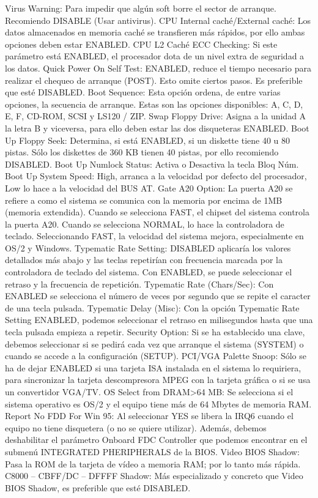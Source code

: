\documentclass[12pt,oneside,a4paper]{article}
\begin{document}
			Virus Warning: Para impedir que algún soft borre el sector de arranque. Recomiendo DISABLE
      (Usar antivirus).
CPU Internal caché/External caché: Los datos almacenados en memoria caché se transfieren
      más rápidos, por ello ambas opciones deben estar ENABLED.
CPU L2 Caché ECC Checking: Si este parámetro está ENABLED, el procesador dota de un
      nivel extra de seguridad a los datos.
Quick Power On Self Test: ENABLED, reduce el tiempo necesario para realizar el chequeo de
        arranque (POST). Esto omite ciertos pasos. Es preferible que esté DISABLED.
Boot Sequence: Esta opción ordena, de entre varias opciones, la secuencia de arranque. Estas son
        las opciones disponibles: A, C, D, E, F, CD-ROM, SCSI y LS120 / ZIP.
Swap Floppy Drive: Asigna a la unidad A la letra B y viceversa, para ello deben estar las dos
        disqueteras ENABLED.
Boot Up Floppy Seek: Determina, si está ENABLED, si un diskette tiene 40 u 80 pistas. Sólo los
        diskettes de 360 KB tienen 40 pistas, por ello recomiendo DISABLED.
Boot Up Numlock Status: Activa o Desactiva la tecla Bloq Núm.
Boot Up System Speed: High, arranca a la velocidad por defecto del procesador, Low lo hace a
      la velocidad del BUS AT.
Gate A20 Option: La puerta A20 se refiere a como el sistema se comunica con la memoria por
      encima de 1MB (memoria extendida). Cuando se selecciona FAST, el chipset del sistema
      controla la puerta A20. Cuando se selecciona NORMAL, lo hace la controladora de
      teclado. Seleccionando FAST, la velocidad del sistema mejora, especialmente en OS/2 y
      Windows.
Typematic Rate Setting: DISABLED aplicaría los valores detallados más abajo y las teclas
      repetirían con frecuencia marcada por la controladora de teclado del sistema. Con
      ENABLED, se puede seleccionar el retraso y la frecuencia de repetición.
Typematic Rate (Chars/Sec): Con ENABLED se selecciona el número de veces por segundo que
      se repite el caracter de una tecla pulsada.
Typematic Delay (Misc): Con la opción Typematic Rate Setting ENABLED, podemos
      seleccionar el retraso en milisegundos hasta que una tecla pulsada empieza a repetir.
Security Option: Si se ha establecido una clave, debemos seleccionar si se pedirá cada vez que
      arranque el sistema (SYSTEM) o cuando se accede a la configuración (SETUP).
PCI/VGA Palette Snoop: Sólo se ha de dejar ENABLED si una tarjeta ISA instalada en el
      sistema lo requiriera, para sincronizar la tarjeta descompresora MPEG con la tarjeta gráfica
      o si se usa un convertidor VGA/TV.
OS Select from DRAM>64 MB: Se selecciona si el sistema operativo es OS/2 y el equipo
      tiene más de 64 Mbytes de memoria RAM.
Report No FDD For Win 95: Al seleccionar YES se libera la IRQ6 cuando el equipo no tiene
      disquetera (o no se quiere utilizar). Además, debemos deshabilitar el parámetro Onboard
      FDC Controller que podemos encontrar en el submenú INTEGRATED PHERIPHERALS
      de la BIOS.
Video BIOS Shadow: Pasa la ROM de la tarjeta de vídeo a memoria RAM; por lo tanto más
      rápida.
C8000 – CBFF/DC – DFFFF Shadow: Más especializado y concreto que Video BIOS Shadow,
      es preferible que esté DISABLED.
\end{document}
